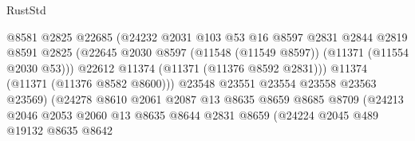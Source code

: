 \begin{lexlean}{RustStd}
\begin{coremodule}
                                        @8581
                                        @2825
                                        @22685
                                        (@24232
                                          @2031
                                          @103
                                          @53
                                          @16
                                          @8597
                                          @2831
                                          @2844
                                          @2819
                                          @8591
                                          @2825
                                          (@22645
                                            @2030
                                            @8597
                                            (@11548 (@11549 @8597))
                                            (@11371 (@11554 @2030 @53)))
                                          @22612
                                          @11374
                                          (@11371 (@11376 @8592 @2831)))
                                        @11374
                                        (@11371 (@11376 @8582 @8600)))
                                      @23548
                                      @23551
                                      @23554
                                      @23558
                                      @23563
                                      @23569)
                                    (@24278
                                      @8610
                                      @2061
                                      @2087
                                      @13
                                      @8635
                                      @8659
                                      @8685
                                      @8709
                                      (@24213
                                        @2046
                                        @2053
                                        @2060
                                        @13
                                        @8635
                                        @8644
                                        @2831
                                        @8659
                                        (@24224
                                          @2045
                                          @489
                                          @19132
                                          @8635
                                          @8642

\end{coremodule}
\end{lexlean}
